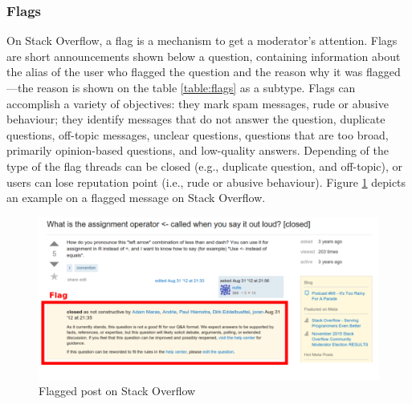 \documentclass{sig-alternate-05-2015}
\begin{document}

\subsubsection*{Flags}

	On Stack Overflow, a flag is a mechanism to get a moderator's attention.
	Flags are short announcements shown below a question, containing information about the alias of the user who flagged the question and the reason why it was flagged---the reason is shown on the table \ref{table:flags} as a subtype.
	Flags can accomplish a variety of objectives: they mark spam messages, rude or abusive behaviour; they identify messages that do not answer the question, duplicate questions, off-topic messages, unclear questions, questions that are too broad, primarily opinion-based questions, and low-quality answers.
	Depending of the type of the flag threads can be closed (e.g., duplicate question, and off-topic), or users can lose reputation point (i.e., rude or abusive behaviour).
	Figure \ref{fig:SOFlagsExample} depicts an example on a flagged message on Stack Overflow.

	\begin{figure} [!htb]
		\centering
		\includegraphics[width=0.9\columnwidth]{Figures/SOFlagsExample}
		\caption{Flagged post on Stack Overflow}
		\label{fig:SOFlagsExample}
	\end{figure}
\end{document}

